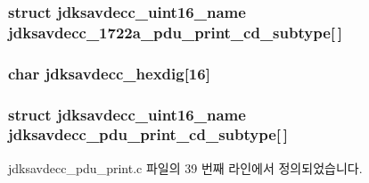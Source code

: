 \subsubsection[{\texorpdfstring{jdksavdecc\+\_\+1722a\+\_\+pdu\+\_\+print\+\_\+cd\+\_\+subtype}{jdksavdecc_1722a_pdu_print_cd_subtype}}]{\setlength{\rightskip}{0pt plus 5cm}struct {\bf jdksavdecc\+\_\+uint16\+\_\+name} jdksavdecc\+\_\+1722a\+\_\+pdu\+\_\+print\+\_\+cd\+\_\+subtype\mbox{[}$\,$\mbox{]}}\hypertarget{group__util_ga4c61ac45e790648ccc89745c4c5f2155}{}\label{group__util_ga4c61ac45e790648ccc89745c4c5f2155}
\subsubsection[{\texorpdfstring{jdksavdecc\+\_\+hexdig}{jdksavdecc_hexdig}}]{\setlength{\rightskip}{0pt plus 5cm}char jdksavdecc\+\_\+hexdig\mbox{[}16\mbox{]}}\hypertarget{group__util_ga798c728bf6289d035258b922bc673618}{}\label{group__util_ga798c728bf6289d035258b922bc673618}
\subsubsection[{\texorpdfstring{jdksavdecc\+\_\+pdu\+\_\+print\+\_\+cd\+\_\+subtype}{jdksavdecc_pdu_print_cd_subtype}}]{\setlength{\rightskip}{0pt plus 5cm}struct {\bf jdksavdecc\+\_\+uint16\+\_\+name} jdksavdecc\+\_\+pdu\+\_\+print\+\_\+cd\+\_\+subtype\mbox{[}$\,$\mbox{]}}\hypertarget{group__util_ga6e3c1bc9c00f03c08f1af13033015aa0}{}\label{group__util_ga6e3c1bc9c00f03c08f1af13033015aa0}


jdksavdecc\+\_\+pdu\+\_\+print.\+c 파일의 39 번째 라인에서 정의되었습니다.

